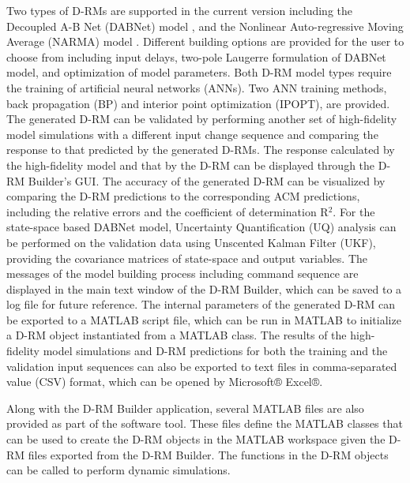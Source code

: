 Two types of D-RMs are supported in the current version including the Decoupled A-B Net (DABNet) model \cite{Sentoni_1998}, and the Nonlinear Auto-regressive Moving Average (NARMA) model \cite{Narendra_1997}.  Different building options are provided for the user to choose from including input delays, two-pole Laugerre formulation of DABNet model, and optimization of model parameters.  Both D-RM model types require the training of artificial neural networks (ANNs).  Two ANN training methods, back propagation (BP) and interior point optimization (IPOPT), are provided.  The generated D-RM can be validated by performing another set of high-fidelity model simulations with a different input change sequence and comparing the response to that predicted by the generated D-RMs.  The response calculated by the high-fidelity model and that by the D-RM can be displayed through the D-RM Builder$\text{'}$s GUI.  The accuracy of the generated D-RM can be visualized by comparing the D-RM predictions to the corresponding ACM predictions, including the relative errors and the coefficient of determination R$^2$.  For the state-space based DABNet model, Uncertainty Quantification (UQ) analysis can be performed on the validation data using Unscented Kalman Filter (UKF), providing the covariance matrices of state-space and output variables.  The messages of the model building process including command sequence are displayed in the main text window of the D-RM Builder, which can be saved to a log file for future reference.  The internal parameters of the generated D-RM can be exported to a MATLAB script file, which can be run in MATLAB to initialize a D-RM object instantiated from a MATLAB class.  The results of the high-fidelity model simulations and D-RM predictions for both the training and the validation input sequences can also be exported to text files in comma-separated value (CSV) format, which can be opened by Microsoft® Excel®.

Along with the D-RM Builder application, several MATLAB files are also provided as part of the software tool.  These files define the MATLAB classes that can be used to create the D-RM objects in the MATLAB workspace given the D-RM files exported from the D-RM Builder.  The functions in the D-RM objects can be called to perform dynamic simulations.
